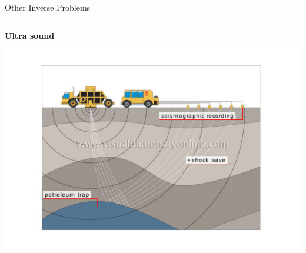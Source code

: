 \documentclass{beamer}
\begin{document}
\begin{frame}{Other Inverse Problems}


\begin{columns}[T]

     {\bf Ultra sound}\\
    \includegraphics[width=.7\textwidth, trim={6.7em 4em 7em 5em}, clip]{InverseProblem_petroleum}


\end{columns}
\end{frame}
\end{document}
